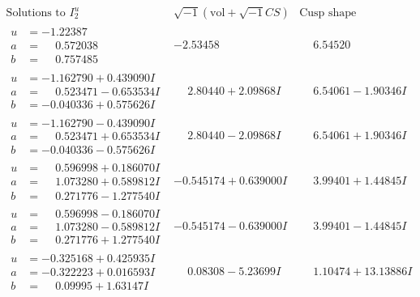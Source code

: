 \documentclass[1p]{elsarticle_modified}
\theoremstyle{definition}
\newcommand{\I}{\sqrt{-1}}
\begin{document}
$$\begin{array}{c|c|c}  
\text{Solutions to }I^u_{2}& \I (\text{vol} + \sqrt{-1}CS) & \text{Cusp shape}\\
 \hline 
\begin{aligned}
u &= -1.22387\phantom{ +0.000000I} \\
a &= \phantom{-}0.572038\phantom{ +0.000000I} \\
b &= \phantom{-}0.757485\phantom{ +0.000000I}\end{aligned}
 & -2.53458\phantom{ +0.000000I} & \phantom{-}6.54520\phantom{ +0.000000I} \\ \hline\begin{aligned}
u &= -1.162790 + 0.439090 I \\
a &= \phantom{-}0.523471 - 0.653534 I \\
b &= -0.040336 + 0.575626 I\end{aligned}
 & \phantom{-}2.80440 + 2.09868 I & \phantom{-}6.54061 - 1.90346 I \\ \hline\begin{aligned}
u &= -1.162790 - 0.439090 I \\
a &= \phantom{-}0.523471 + 0.653534 I \\
b &= -0.040336 - 0.575626 I\end{aligned}
 & \phantom{-}2.80440 - 2.09868 I & \phantom{-}6.54061 + 1.90346 I \\ \hline\begin{aligned}
u &= \phantom{-}0.596998 + 0.186070 I \\
a &= \phantom{-}1.073280 + 0.589812 I \\
b &= \phantom{-}0.271776 - 1.277540 I\end{aligned}
 & -0.545174 + 0.639000 I & \phantom{-}3.99401 + 1.44845 I \\ \hline\begin{aligned}
u &= \phantom{-}0.596998 - 0.186070 I \\
a &= \phantom{-}1.073280 - 0.589812 I \\
b &= \phantom{-}0.271776 + 1.277540 I\end{aligned}
 & -0.545174 - 0.639000 I & \phantom{-}3.99401 - 1.44845 I \\ \hline\begin{aligned}
u &= -0.325168 + 0.425935 I \\
a &= -0.322223 + 0.016593 I \\
b &= \phantom{-}0.09995 + 1.63147 I\end{aligned}
 & \phantom{-}0.08308 - 5.23699 I & \phantom{-}1.10474 + 13.13886 I \\ \hline\begin{aligned}

\end{aligned}
\end{array}$$
\end{document}
